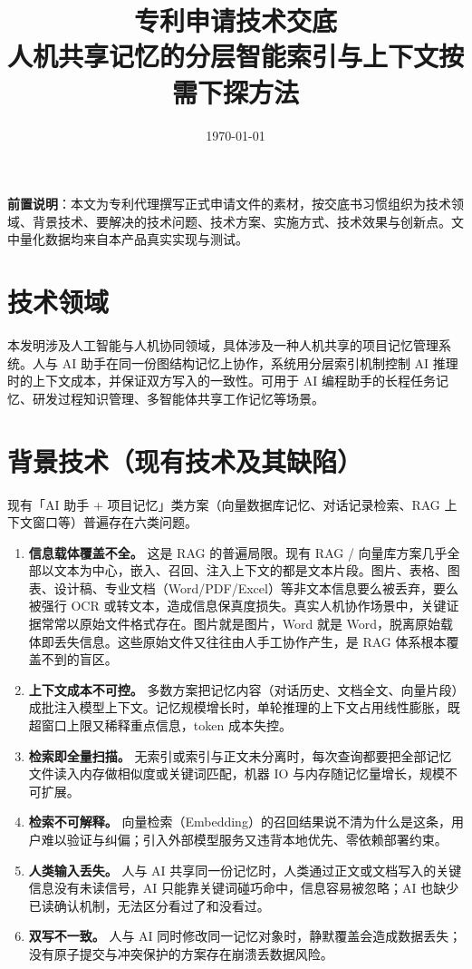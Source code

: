 \documentclass[12pt,a4paper]{article}
\title{\textbf{专利申请技术交底}\\[0.3em]
\large 人机共享记忆的分层智能索引与上下文按需下探方法}
\author{}
\date{\today}
\begin{document}
\maketitle
\thispagestyle{empty}

\noindent\textbf{前置说明}：本文为专利代理撰写正式申请文件的素材，按交底书习惯组织为技术领域、背景技术、要解决的技术问题、技术方案、实施方式、技术效果与创新点。文中量化数据均来自本产品真实实现与测试。

\section{技术领域}
本发明涉及人工智能与人机协同领域，具体涉及一种人机共享的项目记忆管理系统。人与 AI 助手在同一份图结构记忆上协作，系统用分层索引机制控制 AI 推理时的上下文成本，并保证双方写入的一致性。可用于 AI 编程助手的长程任务记忆、研发过程知识管理、多智能体共享工作记忆等场景。

\section{背景技术（现有技术及其缺陷）}
现有「AI 助手 + 项目记忆」类方案（向量数据库记忆、对话记录检索、RAG 上下文窗口等）普遍存在六类问题。

\begin{enumerate}[leftmargin=2em,itemsep=2pt]
\item \textbf{信息载体覆盖不全。} 这是 RAG 的普遍局限。现有 RAG / 向量库方案几乎全部以文本为中心，嵌入、召回、注入上下文的都是文本片段。图片、表格、图表、设计稿、专业文档（Word/PDF/Excel）等非文本信息要么被丢弃，要么被强行 OCR 或转文本，造成信息保真度损失。真实人机协作场景中，关键证据常常以原始文件格式存在。图片就是图片，Word 就是 Word，脱离原始载体即丢失信息。这些原始文件又往往由人手工协作产生，是 RAG 体系根本覆盖不到的盲区。
\item \textbf{上下文成本不可控。} 多数方案把记忆内容（对话历史、文档全文、向量片段）成批注入模型上下文。记忆规模增长时，单轮推理的上下文占用线性膨胀，既超窗口上限又稀释重点信息，token 成本失控。
\item \textbf{检索即全量扫描。} 无索引或索引与正文未分离时，每次查询都要把全部记忆文件读入内存做相似度或关键词匹配，机器 IO 与内存随记忆量增长，规模不可扩展。
\item \textbf{检索不可解释。} 向量检索（Embedding）的召回结果说不清为什么是这条，用户难以验证与纠偏；引入外部模型服务又违背本地优先、零依赖部署约束。
\item \textbf{人类输入丢失。} 人与 AI 共享同一份记忆时，人类通过正文或文档写入的关键信息没有未读信号，AI 只能靠关键词碰巧命中，信息容易被忽略；AI 也缺少已读确认机制，无法区分看过了和没看过。
\item \textbf{双写不一致。} 人与 AI 同时修改同一记忆对象时，静默覆盖会造成数据丢失；没有原子提交与冲突保护的方案存在崩溃丢数据风险。
\end{enumerate}
\end{document}
